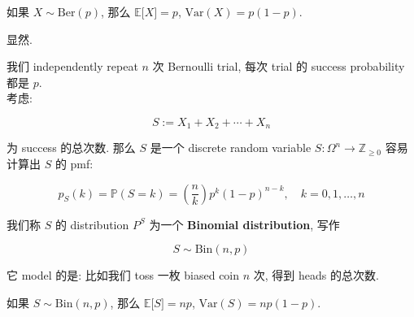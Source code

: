 \documentclass{qlnotes-export}
\begin{document}
\begin{proposition}\label{prop-02-random-variables-proposition-010}

如果 \(X \sim \text{Ber}(p)\), 那么 \({\mathbb{E}}\lbrack X\rbrack = p\), \(\text{Var}(X) = p(1 - p)\).

\end{proposition}

显然.

\begin{example}\label{ex-02-random-variables-binomial-distribution}

我们 independently repeat \(n\) 次 Bernoulli trial, 每次 trial 的 success probability 都是 \(p\).\\
考虑:

\[S := X_{1} + X_{2} + \cdots + X_{n}\]

为 success 的总次数. 那么 \(S\) 是一个 discrete random variable \(S:\Omega^{n}\rightarrow{\mathbb{Z}}_{\geq 0}\) 容易计算出 \(S\) 的 pmf:

\[p_{S}(k) = {\mathbb{P}}(S = k) = \left( \frac{n}{k} \right)p^{k}(1 - p)^{n - k},\quad k = 0,1,\ldots,n\]

我们称 \(S\) 的 distribution \(P^{S}\) 为一个 \textbf{Binomial distribution}, 写作

\[S \sim \text{Bin}(n,p)\]

它 model 的是: 比如我们 toss 一枚 biased coin \(n\) 次, 得到 heads 的总次数.\\

\end{example}

\begin{proposition}\label{prop-02-random-variables-proposition-011}

如果 \(S \sim \text{Bin}(n,p)\), 那么 \({\mathbb{E}}\lbrack S\rbrack = np\), \(\text{Var}(S) = np(1 - p)\).

\end{proposition}
\end{document}
